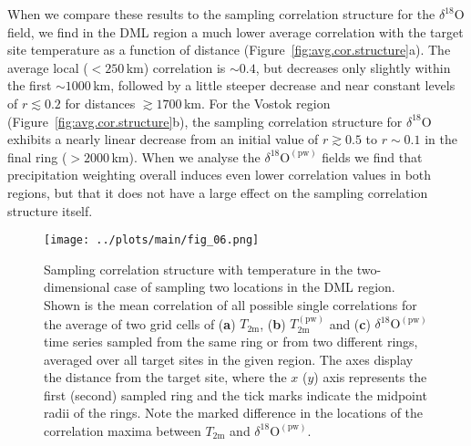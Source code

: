 \documentclass[draft]{agujournal2019}
\begin{document}
When we compare these results to the sampling correlation structure for the
$\delta^{18}\mathrm{O}$ field, we find in the DML region a much lower average
correlation with the target site temperature as a function of distance
(Figure~\ref{fig:avg.cor.structure}a). The average local ($<250$\,km) correlation
is $\sim0.4$, but decreases only slightly within the first $\sim1000$\,km,
followed by a little steeper decrease and near constant levels of $r\lesssim0.2$
for distances $\gtrsim1700$\,km. For the Vostok region
(Figure~\ref{fig:avg.cor.structure}b), the sampling correlation structure for
$\delta^{18}\mathrm{O}$ exhibits a nearly linear decrease from an initial value
of $r\gtrsim0.5$ to $r\sim0.1$ in the final ring ($>2000$\,km). When we analyse
the $\delta^{18}\mathrm{O}^{\mathrm{(pw)}}$ fields we find that precipitation
weighting overall induces even lower correlation values in both regions, but
that it does not have a large effect on the sampling correlation structure
itself.

\begin{figure*}[t]%
\centering
\texttt{[image: ../plots/main/fig\_06.png]}
\caption{%
  Sampling correlation structure with temperature in the two-dimensional case
  of sampling two locations in the DML region. Shown is the mean correlation of
  all possible single correlations for the average of two grid cells of
  (\textbf{a}) $T_{\mathrm{2m}}$, (\textbf{b}) $T_{\mathrm{2m}}^{\mathrm{(pw)}}$
  and (\textbf{c}) $\delta^{18}\mathrm{O}^{\mathrm{(pw)}}$ time series sampled
  from the same ring or from two different rings, averaged over all target sites
  in the given region. The axes display the distance from the target site, where
  the $x$ ($y$) axis represents the first (second) sampled ring and the tick
  marks indicate the midpoint radii of the rings. Note the marked difference
  in the locations of the correlation maxima between $T_{\mathrm{2m}}$ and
  $\delta^{18}\mathrm{O}^{\mathrm{(pw)}}$.}
\label{fig:two-core-correlation}%
\end{figure*}%
\end{document}
